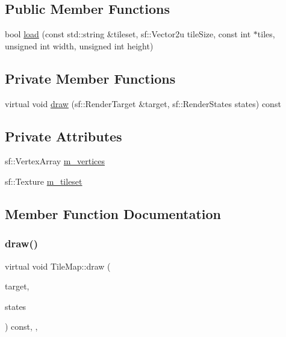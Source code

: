 \subsection*{Public Member Functions}
\begin{DoxyCompactItemize}
\item 
bool \hyperlink{classTileMap_a5bc3325e2382599c3f986ac64481e832}{load} (const std\+::string \&tileset, sf\+::\+Vector2u tile\+Size, const int $\ast$tiles, unsigned int width, unsigned int height)
\end{DoxyCompactItemize}
\subsection*{Private Member Functions}
\begin{DoxyCompactItemize}
\item 
virtual void \hyperlink{classTileMap_a52562e9fb37f32fc482d7d64a2e48630}{draw} (sf\+::\+Render\+Target \&target, sf\+::\+Render\+States states) const
\end{DoxyCompactItemize}
\subsection*{Private Attributes}
\begin{DoxyCompactItemize}
\item 
sf\+::\+Vertex\+Array \hyperlink{classTileMap_a1070824d191a06562a31df73cbe7fe99}{m\+\_\+vertices}
\item 
sf\+::\+Texture \hyperlink{classTileMap_a8be6cb9e600cfd213ba6499aabbcc50b}{m\+\_\+tileset}
\end{DoxyCompactItemize}


\subsection{Member Function Documentation}
\mbox{\label{classTileMap_a52562e9fb37f32fc482d7d64a2e48630}} 
\subsubsection{\texorpdfstring{draw()}{draw()}}
{\footnotesize\ttfamily virtual void Tile\+Map\+::draw (\begin{DoxyParamCaption}\item[{sf\+::\+Render\+Target \&}]{target,  }\item[{sf\+::\+Render\+States}]{states }\end{DoxyParamCaption}) const\hspace{0.3cm}{\ttfamily [inline]}, {\ttfamily [private]}, {\ttfamily [virtual]}}

